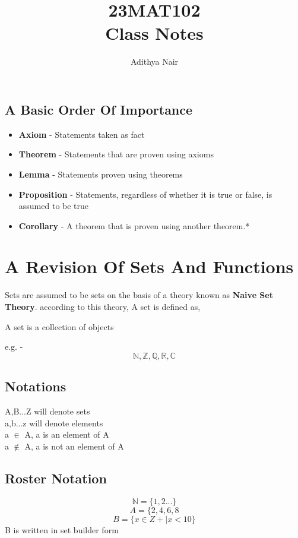 \documentclass{report}
\title{\Huge{23MAT102}\\ Class Notes}
\author{\huge{Adithya Nair}}
\date{}
\begin{document}
\maketitle
\newpage%
\tableofcontents

\pagebreak
\section{A Basic Order Of Importance}
\begin{itemize}
    \item \textbf{Axiom} - Statements taken as fact
    \item \textbf{Theorem} - Statements that are proven using axioms
    \item \textbf{Lemma} - Statements proven using theorems
    \item \textbf{Proposition} - Statements, regardless of whether it is true or false, is assumed to be true
    \item \textbf{Corollary} - A theorem that is proven using another theorem.*
\end{itemize}
\chapter{A Revision Of Sets And Functions}
Sets are assumed to be sets on the basis of a theory known as \textbf{Naive Set Theory}. according to this theory, A set is defined as,

\begin{definition}[Sets]
A set is a collection of objects
\end{definition}

e.g. - \[\mathbb{N}, \mathbb{Z}, \mathbb{Q}, \mathbb{R}, \mathbb{C}\]

\section{Notations}
A,B...Z will denote sets\\
a,b...z will denote elements\\
a $\in$ A, a is an element of A\\
a $\notin$  A, a is not an element of A\\

\section{Roster Notation}
\[\mathbb{N} = \{1,2...\}\]
\[A = \{2,4,6,8\]
\[B = \{ x \in Z+| x < 10 \} \]
 B is written in set builder form
\end{document}
